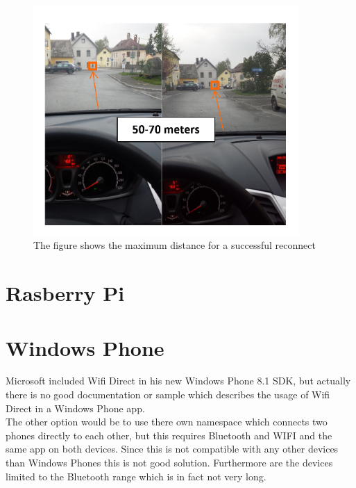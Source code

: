\begin{figure}[ht]
	\centering
  \includegraphics[width=0.9\textwidth]{images/androidScreen5.png}
	\caption{The figure shows the maximum distance for a successful reconnect}
	\label{fig1}
\end{figure}

\section{Rasberry Pi}
\label{sec:RasberryPi}

\section{Windows Phone}
\label{sec:WindowsPhone}
Microsoft included Wifi Direct in his new Windows Phone 8.1 SDK, but actually there is no good documentation or sample which describes the usage of Wifi Direct in a Windows Phone app.\\
The other option would be to use there own namespace which connects two phones directly to each other, but this requires Bluetooth and WIFI and the same app on both devices. Since this is not compatible with any other devices than Windows Phones this is not good solution. Furthermore are the devices limited to the Bluetooth range which is in fact not very long.